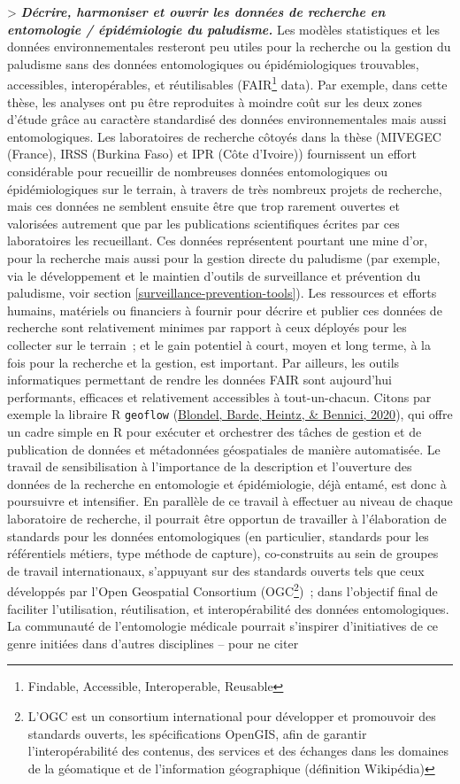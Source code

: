 \documentclass[12pt,twoside]{reedthesis}
\begin{document}
\textgreater{} \textbf{\emph{Décrire, harmoniser et ouvrir les données de recherche en entomologie / épidémiologie du paludisme.}} Les modèles statistiques et les données environnementales resteront peu utiles pour la recherche ou la gestion du paludisme sans des données entomologiques ou épidémiologiques trouvables, accessibles, interopérables, et réutilisables (FAIR\footnote{Findable, Accessible, Interoperable, Reusable} data). Par exemple, dans cette thèse, les analyses ont pu être reproduites à moindre coût sur les deux zones d'étude grâce au caractère standardisé des données environnementales mais aussi entomologiques. Les laboratoires de recherche côtoyés dans la thèse (MIVEGEC (France), IRSS (Burkina Faso) et IPR (Côte d'Ivoire)) fournissent un effort considérable pour recueillir de nombreuses données entomologiques ou épidémiologiques sur le terrain, à travers de très nombreux projets de recherche, mais ces données ne semblent ensuite être que trop rarement ouvertes et valorisées autrement que par les publications scientifiques écrites par ces laboratoires les recueillant. Ces données représentent pourtant une mine d'or, pour la recherche mais aussi pour la gestion directe du paludisme (par exemple, via le développement et le maintien d'outils de surveillance et prévention du paludisme, voir section \ref{surveillance-prevention-tools}). Les ressources et efforts humains, matériels ou financiers à fournir pour décrire et publier ces données de recherche sont relativement minimes par rapport à ceux déployés pour les collecter sur le terrain~; et le gain potentiel à court, moyen et long terme, à la fois pour la recherche et la gestion, est important. Par ailleurs, les outils informatiques permettant de rendre les données FAIR sont aujourd'hui performants, efficaces et relativement accessibles à tout-un-chacun. Citons par exemple la libraire R \texttt{geoflow} (\protect\hyperlink{ref-emmanuel_blondel_2020_4275926}{Blondel, Barde, Heintz, \& Bennici, 2020}), qui offre un cadre simple en R pour exécuter et orchestrer des tâches de gestion et de publication de données et métadonnées géospatiales de manière automatisée. Le travail de sensibilisation à l'importance de la description et l'ouverture des données de la recherche en entomologie et épidémiologie, déjà entamé, est donc à poursuivre et intensifier. En parallèle de ce travail à effectuer au niveau de chaque laboratoire de recherche, il pourrait être opportun de travailler à l'élaboration de standards pour les données entomologiques (en particulier, standards pour les référentiels métiers, type méthode de capture), co-construits au sein de groupes de travail internationaux, s'appuyant sur des standards ouverts tels que ceux développés par l'Open Geospatial Consortium (OGC\footnote{L'OGC est un consortium international pour développer et promouvoir des standards ouverts, les spécifications OpenGIS, afin de garantir l'interopérabilité des contenus, des services et des échanges dans les domaines de la géomatique et de l'information géographique (définition Wikipédia)})~; dans l'objectif final de faciliter l'utilisation, réutilisation, et interopérabilité des données entomologiques. La communauté de l'entomologie médicale pourrait s'inspirer d'initiatives de ce genre initiées dans d'autres disciplines -- pour ne citer 
\end{document}
